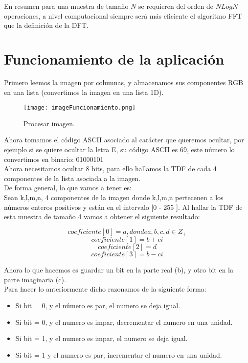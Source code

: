 \documentclass[a4paper]{article}
\begin{document}
En resumen para una muestra de tamaño $N$ se requieren del orden de $N Log N$ operaciones, a nivel computacional siempre será más eficiente el algoritmo FFT que la definición de la DFT.

\section{Funcionamiento de la aplicación}

Primero leemos la imagen por columnas, y almacenamos sus componentes RGB en una lista (convertimos la imagen en una lista 1D).   

\begin{figure}[htpb]
\centering
\texttt{[image: imageFuncionamiento.png]}
\caption{\label{fig:ventanimagena}Procesar imagen.}
\end{figure}

Ahora tomamos el código ASCII asociado al carácter que queremos ocultar, por ejemplo si se quiere ocultar la letra E,  su código ASCII es 69, este número lo convertimos en binario:  01000101 \\

Ahora necesitamos ocultar 8 bits, para ello hallamos la TDF de cada 4 componentes de la lista asociada a la imagen. \\

De forma general, lo que vamos a tener es: \\
Sean k,l,m,n,  4 componentes de la imagen donde k,l,m,n pertecenen a los números enteros positivos y están en el intervalo [0 - 255 ]. Al hallar la TDF de esta muestra de tamaño 4 vamos a obtener el siguiente resultado:

$$coeficiente[0] = a, donde a, b, c, d \in Z_+  $$
$$coeficiente[1] = b + ci$$
$$coeficiente[2] = d$$
$$coeficiente[3] = b - ci$$

Ahora lo que hacemos es guardar un bit en la parte real (b), y otro bit en la parte imaginaria (c). \\

Para hacer lo anteriormente dicho razonamos de la siguiente forma:

\begin{itemize}
\item Si bit = 0, y el número es par, el numero se deja igual.
\item Si bit = 0, y el numero es impar, decrementar el numero en una unidad.
\item Si bit = 1, y el numero es impar, el numero se deja igual.
\item Si bit = 1 y el numero es  par, incrementar el numero en una unidad.\\
\end{itemize}
\end{document}
